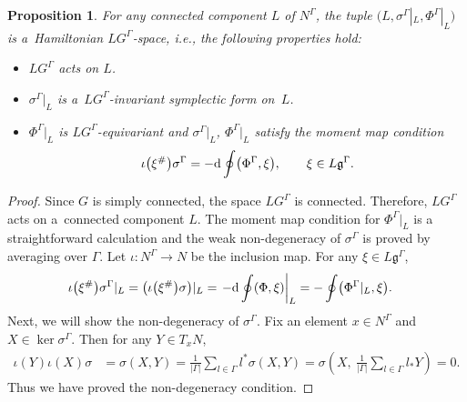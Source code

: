 \documentclass[10pt,a4paper]{amsart}
\numberwithin{equation}{section}
\newtheorem{Proposition}[Theorem]{Proposition}
\theoremstyle{definition}
\begin{document}
\begin{Proposition}
 For any connected component $L$ of $N^{\Gamma}$, the tuple
 $\bigl(L, \sigma^{\Gamma}|_L, \Phi^{\Gamma}|_L\bigr)$ is a~Hamiltonian $LG^{\Gamma}$-space, i.e., the following properties hold:
\begin{itemize}\itemsep=0pt
 \item $LG^{\Gamma}$ acts on $L$.
 \item $\sigma^{\Gamma}|_L$ is a~$LG^{\Gamma}$-invariant symplectic form on~$L$.
 \item $\Phi^{\Gamma}|_L$ is $LG^{\Gamma}$-equivariant and $\sigma^{\Gamma}|_L$, $\Phi^{\Gamma}|_L$ satisfy the moment map condition
 \[\iota\bigl(\xi^{\#}\bigr)\sigma^{\Gamma} = - {\rm d} \oint \bigl(\Phi^{\Gamma},\xi\bigr), \qquad \xi \in L\mathfrak{g}^{\Gamma}.\]
 \end{itemize}
\end{Proposition}

\begin{proof}
 Since $G$ is simply connected, the space $LG^{\Gamma}$ is connected.
 Therefore, $LG^{\Gamma}$ acts on a~connected component $L$.
 The moment map condition for $\Phi^{\Gamma}|_L$ is a straightforward calculation and
 the weak non-degeneracy of $\sigma^{\Gamma}$ is proved by averaging over $\Gamma$.
 Let $\iota \colon N^{\Gamma} \to N$ be the inclusion map.
 For any $\xi \in L\mathfrak{g}^{\Gamma}$,
 \begin{align*}
 \iota\bigl(\xi^{\#}\bigr)\sigma^{\Gamma}|_L &= \bigl(\iota\bigl(\xi^{\#}\bigr)\sigma\bigr)|_{L} = \left. -{\rm d} \oint (\Phi,\xi) \right|_{L} = - \oint \bigl(\Phi^{\Gamma} |_{L},\xi \bigr).
 \end{align*}
 Next, we will show the non-degeneracy of $\sigma^{\Gamma}$.
 Fix an element $x \in N^{\Gamma}$ and $X \in \ker\sigma^{\Gamma}$.
 Then for any $Y \in T_xN$,
 \begin{align*}
 \iota(Y)\iota(X) \sigma &= \sigma(X,Y)= \frac{1}{|\Gamma|}\sum_{l \in \Gamma} l^*\sigma(X,Y) = \sigma\left( X,\ \frac{1}{|\Gamma|} \sum_{l \in \Gamma}l_*Y \right)
 = 0.
 \end{align*}
 Thus we have proved the non-degeneracy condition.
\end{proof}
\end{document}
